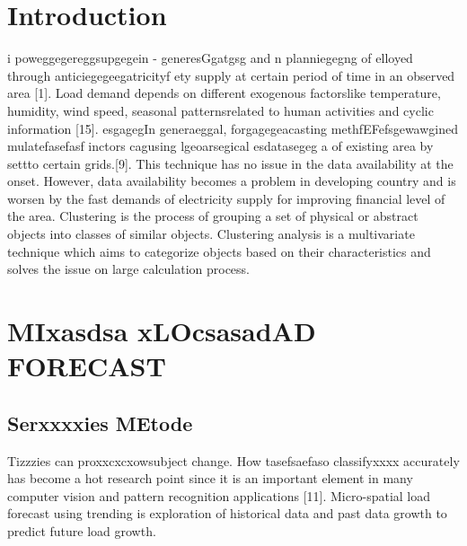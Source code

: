 \documentclass[conference]{IEEEtran}
\begin{document}
\section{Introduction}i
 poweggegereggsupgegein - generesGgatgsg  and n planniegegng of elloyed through anticiegegeegatricityf ety supply at certain period of time in an observed area [1]. Load demand depends on different exogenous factorslike temperature, humidity, wind speed, seasonal patternsrelated to human activities and cyclic information [15].
esgagegIn generaeggal, forgagegeacasting methfEFefsgewawgined mulatefasefasf inctors cagusing lgeoarsegical esdatasegeg a of existing area by settto certain grids.[9]. This technique has no issue in the data availability at the onset. However, data availability becomes a problem in developing country and is worsen by the fast demands of electricity supply for improving financial level of the area. Clustering is the process of grouping a set of physical or abstract objects into classes of similar objects. Clustering analysis is a multivariate technique which aims to categorize objects based on their characteristics and solves the issue on large calculation process.

\section{MIxasdsa xLOcsasadAD FORECAST}
\subsection{Serxxxxies MEtode}
Tizzzies can proxxcxcxowsubject change. How tasefsaefaso classifyxxxx accurately has become a hot research point since it is an important element in many computer vision and pattern recognition applications [11]. Micro-spatial load forecast using trending is exploration of historical data and past data growth to predict future load growth. 
\end{document}
